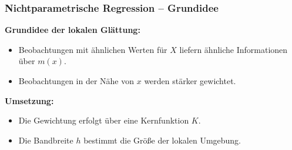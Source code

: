 \documentclass{beamer}
\newif\ifpauseswitch
\begin{document}
	
	\begin{frame}
		\frametitle{Nichtparametrische Regression – Grundidee}
		
		\textbf{Grundidee der lokalen Glättung:}
		\begin{itemize}
			\itemsep8pt
			\item Beobachtungen mit ähnlichen Werten für $X$ liefern ähnliche Informationen über $m(x)$.
			\item Beobachtungen in der Nähe von $x$ werden stärker gewichtet.
		\end{itemize}
		
		\vspace{0.5em}
		
		\ifpauseswitch
		\pause
		\fi
		
		\textbf{Umsetzung:}
		\begin{itemize}
			\itemsep8pt
			\item Die Gewichtung erfolgt über eine Kernfunktion $K$.
			\item Die Bandbreite $h$ bestimmt die Größe der lokalen Umgebung.
		\end{itemize}
	\end{frame}
	
\end{document}
